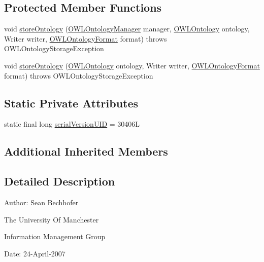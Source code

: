 \subsection*{Protected Member Functions}
\begin{DoxyCompactItemize}
\item 
void \hyperlink{classuk_1_1ac_1_1manchester_1_1owl_1_1owlapi_1_1tutorial_1_1io_1_1_o_w_l_tutorial_syntax_ontology_storer_a1fa3ee9d2c5ff06cd82880666bf32909}{store\-Ontology} (\hyperlink{interfaceorg_1_1semanticweb_1_1owlapi_1_1model_1_1_o_w_l_ontology_manager}{O\-W\-L\-Ontology\-Manager} manager, \hyperlink{interfaceorg_1_1semanticweb_1_1owlapi_1_1model_1_1_o_w_l_ontology}{O\-W\-L\-Ontology} ontology, Writer writer, \hyperlink{classorg_1_1semanticweb_1_1owlapi_1_1model_1_1_o_w_l_ontology_format}{O\-W\-L\-Ontology\-Format} format)  throws O\-W\-L\-Ontology\-Storage\-Exception 
\item 
void \hyperlink{classuk_1_1ac_1_1manchester_1_1owl_1_1owlapi_1_1tutorial_1_1io_1_1_o_w_l_tutorial_syntax_ontology_storer_a79b7e8cb6275fe81ca58f48862317996}{store\-Ontology} (\hyperlink{interfaceorg_1_1semanticweb_1_1owlapi_1_1model_1_1_o_w_l_ontology}{O\-W\-L\-Ontology} ontology, Writer writer, \hyperlink{classorg_1_1semanticweb_1_1owlapi_1_1model_1_1_o_w_l_ontology_format}{O\-W\-L\-Ontology\-Format} format)  throws O\-W\-L\-Ontology\-Storage\-Exception 
\end{DoxyCompactItemize}
\subsection*{Static Private Attributes}
\begin{DoxyCompactItemize}
\item 
static final long \hyperlink{classuk_1_1ac_1_1manchester_1_1owl_1_1owlapi_1_1tutorial_1_1io_1_1_o_w_l_tutorial_syntax_ontology_storer_acc8294f0e1eb3711403d61d7ff8ddb9f}{serial\-Version\-U\-I\-D} = 30406\-L
\end{DoxyCompactItemize}
\subsection*{Additional Inherited Members}


\subsection{Detailed Description}
Author\-: Sean Bechhofer\par
 The University Of Manchester\par
 Information Management Group\par
 Date\-: 24-\/\-April-\/2007\par
 \par
 

